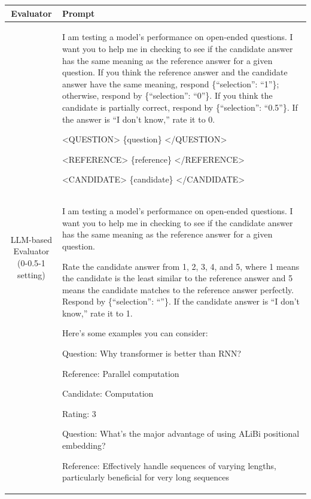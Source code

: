 \begin{table}[!t]
\centering
\small
\renewcommand\tabcolsep{1.0pt} %
\begin{tabular}{cp{11.5cm}}
    \toprule
    \textbf{Evaluator} & \textbf{Prompt} \\
    \midrule
    \multirow{8}{*}{\parbox{4cm}{\centering LLM-based Evaluator \\(0-0.5-1 setting)}}
    &  I am testing a model's performance on open-ended questions. I want you to help me in checking to see if the candidate answer has the same meaning as the reference answer for a given question. If you think the reference answer and the candidate answer have the same meaning, respond \{``selection'': ``1''\}; otherwise, respond by \{``selection'': ``0''\}. If you think the candidate is partially correct, respond by \{``selection'': ``0.5''\}. If the answer is ``I don't know,'' rate it to 0.

    <QUESTION>
    \{question\}
    </QUESTION>

    <REFERENCE>
    \{reference\}
    </REFERENCE>

    <CANDIDATE>
    \{candidate\}
    </CANDIDATE>
\\
\midrule

\multirow{28}{*}{\parbox{4cm}{\centering LLM-based Evaluator \\(1-2-3-4-5 setting)}}
    &  I am testing a model's performance on open-ended questions. I want you to help me in checking to see if the candidate answer has the same meaning as the reference answer for a given question. 
    
    Rate the candidate answer from 1, 2, 3, 4, and 5, where 1 means the candidate is the least similar to the reference answer and 5 means the candidate matches to the reference answer perfectly. 
    Respond by \{``selection'': ``''\}. If the candidate answer is ``I don't know,'' rate it to 1.

    Here's some examples you can consider:
    
    Question: Why transformer is better than RNN?
    
    Reference: Parallel computation
    
    Candidate: Computation
    
    Rating: 3

    Question: What's the major advantage of using ALiBi positional embedding?
    
    Reference: Effectively handle sequences of varying lengths, particularly beneficial for very long sequences
    

\end{tabular}
\end{table}
